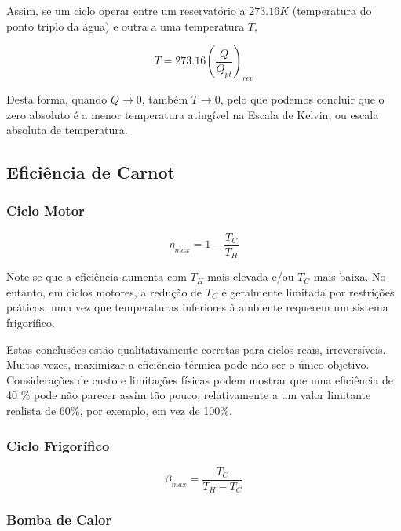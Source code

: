 Assim, se um ciclo operar entre um reservatório a $273.16 K$ (temperatura do ponto triplo da água) e outra a uma temperatura $T$,

\begin{equation*}
    T = 273.16 \left( \frac{Q}{Q_{pt}} \right)_{rev}
\end{equation*}

Desta forma, quando $Q \to 0$, também $T \to 0$, pelo que podemos concluir que o zero absoluto é a menor temperatura atingível na Escala de Kelvin, ou escala absoluta de temperatura.

\subsection{Eficiência de Carnot}

\subsubsection{Ciclo Motor}

\begin{equation}
    \eta_{max} = 1 - \frac{T_C}{T_H}
\end{equation}

Note-se que a eficiência aumenta com $T_H$ mais elevada e/ou $T_C$ mais baixa. No entanto, em ciclos motores, a redução de $T_C$ é geralmente limitada por restrições práticas, uma vez que temperaturas inferiores à ambiente requerem um sistema frigorífico.

Estas conclusões estão qualitativamente corretas para ciclos reais, irreversíveis. Muitas vezes, maximizar a eficiência térmica pode não ser o único objetivo. Considerações de custo e limitações físicas podem mostrar que uma eficiência de 40 \% pode não parecer assim tão pouco, relativamente a um valor limitante realista de 60\%, por exemplo, em vez de 100\%.

\subsubsection{Ciclo Frigorífico}

\begin{equation}
    \beta_{max} = \frac{T_C}{T_H - T_C}
\end{equation}

\subsubsection{Bomba de Calor}

